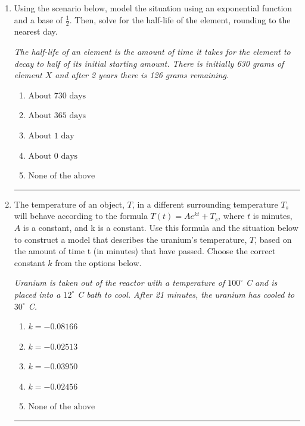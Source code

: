 \documentclass[14pt]{extbook}
\newcommand{\litem}[1]{\item#1\hspace*{-1cm}\rule{\textwidth}{0.4pt}}
\begin{document}
\begin{enumerate}
{\begin{enumerate}[label=\Alph*.]
\end{enumerate} }
\litem{
Using the scenario below, model the situation using an exponential function and a base of $\frac{1}{2}$. Then, solve for the half-life of the element, rounding to the nearest day.
\begin{center}
    \textit{ The half-life of an element is the amount of time it takes for the element to decay to half of its initial starting amount. There is initially 630 grams of element $X$ and after 2 years there is 126 grams remaining. }
\end{center}
\begin{enumerate}[label=\Alph*.]
\item \( \text{About } 730 \text{ days} \)
\item \( \text{About } 365 \text{ days} \)
\item \( \text{About } 1 \text{ day} \)
\item \( \text{About } 0 \text{ days} \)
\item \( \text{None of the above} \)

\end{enumerate} }
\litem{
The temperature of an object, $T$, in a different surrounding temperature $T_s$ will behave according to the formula $T(t) = Ae^{kt} + T_s$, where $t$ is minutes, $A$ is a constant, and k is a constant. Use this formula and the situation below to construct a model that describes the uranium's temperature, $T$, based on the amount of time t (in minutes) that have passed. Choose the correct constant $k$ from the options below.
\begin{center}
    \textit{ Uranium is taken out of the reactor with a temperature of $100^{\circ}$ C and is placed into a $12^{\circ}$ C bath to cool. After 21 minutes, the uranium has cooled to $30^{\circ}$ C. }
\end{center}
\begin{enumerate}[label=\Alph*.]
\item \( k = -0.08166 \)
\item \( k = -0.02513 \)
\item \( k = -0.03950 \)
\item \( k = -0.02456 \)
\item \( \text{None of the above} \)


\end{enumerate}}
\end{enumerate}
\end{document}
